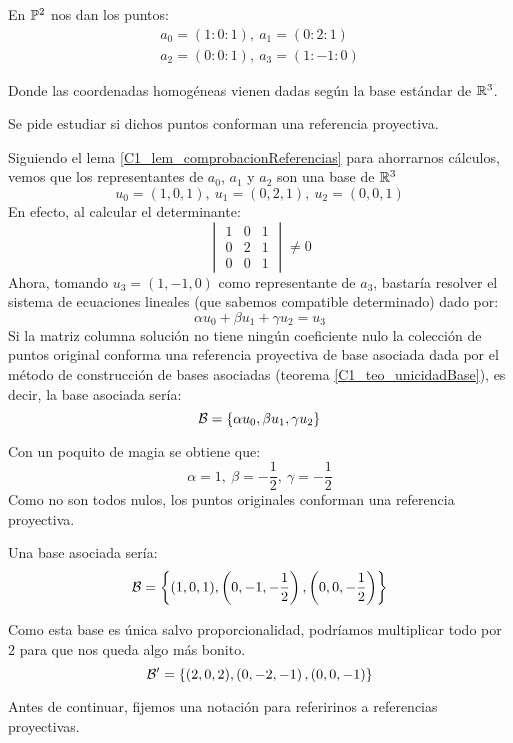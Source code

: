 \begin{exa}
	\label{C1_exa_basesAsociadas}
	En $\mathbb{P}^2$ nos dan los puntos: \begin{gather*}a_0=(1:0:1),\ a_1=(0:2:1)\\a_2=(0:0:1),\ a_3=(1:-1:0)
	\end{gather*}
	
	Donde las coordenadas homogéneas vienen dadas según la base estándar de $\mathbb{R}^3$.
	
	Se pide estudiar si dichos puntos conforman una referencia proyectiva.
	
	Siguiendo el lema \ref{C1_lem_comprobacionReferencias} para ahorrarnos cálculos, vemos que los representantes de $a_0$, $a_1$ y $a_2$ son una base de $\mathbb{R}^3$
		\begin{equation*}
		u_0=(1,0,1),\ u_1=(0,2,1),\ u_2=(0,0,1)
		\end{equation*}
	En efecto, al calcular el determinante:
	\[\begin{vmatrix}
	1 & 0 & 1\\
	0 & 2 & 1\\
	0 & 0 & 1
	\end{vmatrix}\not= 0\]
	Ahora, tomando $u_3=(1,-1,0)$ como representante de $a_3$, bastaría resolver el sistema de ecuaciones lineales (que sabemos compatible determinado) dado por:
	\[\alpha u_0+\beta u_1 + \gamma u_2 = u_3\]
	Si la matriz columna solución no tiene ningún coeficiente nulo la colección de puntos original conforma una referencia proyectiva de base asociada dada por el método de construcción de bases asociadas (teorema \ref{C1_teo_unicidadBase}), es decir, la base asociada sería:\[\mathcal{B}=\{\alpha u_0,\beta u_1, \gamma u_2\}\]
	
	Con un poquito de magia se obtiene que:\[\alpha = 1,\ \beta = -\frac{1}{2},\ \gamma = -\frac{1}{2}\]
	Como no son todos nulos, los puntos originales conforman una referencia proyectiva.
	
	Una base asociada sería:
	\[
	\mathcal{B}=\left\{(1,0,1), \left(0,-1,-\frac{1}{2}\right),\left(0,0,-\frac{1}{2}\right)\right\}
	\]
	
	Como esta base es única salvo proporcionalidad, podríamos multiplicar todo por $2$ para que nos queda algo más bonito.
	\[
	\mathcal{B}'=\left\{(2,0,2), \left(0,-2,-1\right),\left(0,0,-1\right)\right\}
	\]
\end{exa}
Antes de continuar, fijemos una notación para referirinos a referencias proyectivas.

